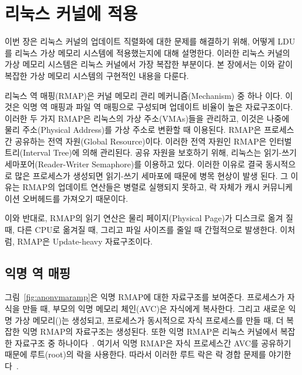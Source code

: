 \newpage
\section{리눅스 커널에 적용}
\label{sec:linux}

이번 장은 리눅스 커널의 업데이트 직렬화에 대한 문제를 해결하기 위해,
어떻게 LDU를 리눅스 가상 메모리 시스템에 적용했는지에 대해 설명한다.
이러한 리눅스 커널의 가상 메모리 시스템은 리눅스 커널에서 가장 복잡한 부분이다.
본 장에서는 이와 같이 복잡한 가상 메모리 시스템의 구현적인 내용을 다룬다.

리눅스 역 매핑(RMAP)은 커널 메모리 관리 메커니즘(Mechanism) 중 하나 이다.
이것은 익명 역 매핑과 파일 역 매핑으로 구성되며 업데이트 비율이 높은 자료구조이다.
이러한 두 가지 RMAP은 리눅스의 가상 주소(VMAs)들을 관리하고, 이것은 나중에 물리 주소(Physical Address)를 
가상 주소로 변환할 때 이용된다.
RMAP은 프로세스 간 공유하는 전역 자원(Global Resource)이다.
이러한 전역 자원인 RMAP은 인터벌 트리(Interval Tree)에 의해 관리된다.
공유 자원을 보호하기 위해, 리눅스는 읽기-쓰기 세마포어(Reader-Writer Semaphore)를 이용하고 있다.
이러한 이유로 결국 동시적으로 많은 프로세스가 생성되면 읽기-쓰기 세마포에 때문에 병목 현상이 발생 된다.
그 이유는 RMAP의 업데이트 연산들은 병렬로 실행되지 못하고, 
락 자체가 캐시 커뮤니케이션 오버헤드를 가져오기 때문이다.

이와 반대로, RMAP의 읽기 연산은 물리 페이지(Physical Page)가 디스크로 옮겨 질 때, 다른 CPU로 옮겨질 때, 그리고 
파일 사이즈를 줄일 때 간헐적으로 발생한다. 
이처럼, RMAP은 Update-heavy 자료구조이다.

\subsection{익명 역 매핑}


그림~\ref{fig:anonvmaramp}은 익명 RMAP에 대한 자료구조를 보여준다.
프로세스가 자식을 만들 때, 부모의 익명 메모리 체인(AVC)은 자식에게 복사한다. 
그리고 새로운 익명 가상 메모리()는 생성되고,
프로세스가 동시적으로 자식 프로세스를 만들 때, 더 복잡한 익명 RMAP의 자료구조는 생성된다.
또한 익명 RMAP은 리눅스 커널에서 복잡한 자료구조 중 하나이다~\cite{CorbetLWNANON}.
여기서 익명 RMAP은 자식 프로세스간 AVC를 공유하기 때문에 루트(root)의 락을 사용한다.
따라서 이러한 루트 락은 락 경합 문제를 야기한다~\cite{Andi2011adding}.  

